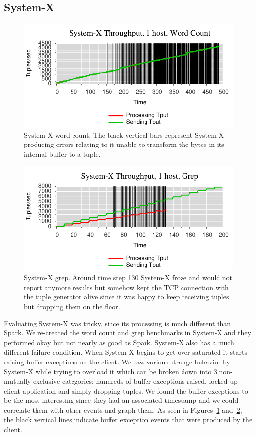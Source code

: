 \subsection{System-X}
\label{ssec:sysx1}

\begin{figure}[t]
\centering
\includegraphics[width=1\linewidth]{figures/sb1_tput.pdf}
\caption{System-X word count. The black vertical bars represent System-X producing errors relating to it unable to transform the bytes in its internal buffer to a tuple.}
\label{fig:sb1-tput}
\end{figure}

\begin{figure}[t]
\centering
\includegraphics[width=1\linewidth]{figures/sb2_tput.pdf}
\caption{System-X grep. Around time step 130 System-X froze and would not report anymore results but somehow kept the TCP connection with the tuple generator alive since it was happy to keep receiving tuples but dropping them on the floor.}
\label{fig:sb2-tput}
\end{figure}

Evaluating System-X was tricky, since its processing is much different than
Spark. We re-created the word count and grep benchmarks in System-X and they
performed okay but not nearly as good as Spark. System-X also has a much
different failure condition. When System-X begins to get over saturated it
starts raising buffer exceptions on the client. We saw various strange behavior
by System-X while trying to overload it which can be broken down into 3
non-mutually-exclusive categories: hundreds of buffer exceptions raised, locked
up client application and simply dropping tuples. We found the buffer
exceptions to be the most interesting since they had an associated timestamp
and we could correlate them with other events and graph them. As seen in 
Figures~\ref{fig:sb1-tput} and~\ref{fig:sb2-tput}, the black vertical lines
indicate buffer exception events that were produced by the client.

